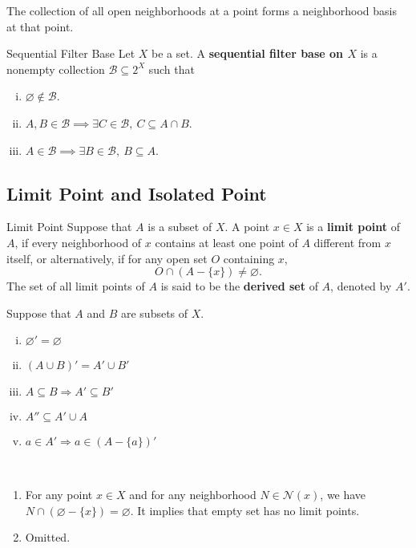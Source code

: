 \documentclass{report}
\begin{document}
\begin{proposition}{}{}
	The collection of all open neighborhoods at a point forms a neighborhood basis at that point.
\end{proposition}

\begin{definition}{Sequential Filter Base}{}
	Let $X$ be a set. A \textbf{sequential filter base on $X$} is a nonempty collection $\mathcal{B}\subseteq 2^X$ such that
	\begin{enumerate}[(i)]
		\item $\varnothing\notin\mathcal{B}$.
		\item $A,B\in\mathcal{B}\implies \exists C\in\mathcal{B},\ C\subseteq A\cap B$.
		\item $A\in\mathcal{B}\implies \exists B\in\mathcal{B},\ B\subseteq A$.
	\end{enumerate}
\end{definition}

\subsection{Limit Point and Isolated Point}
\begin{definition}{Limit Point}{}
	Suppose that $A$ is a subset of $X$. A point $x\in X$ is a \textbf{limit point} of $A$, if every neighborhood of $x$ contains at least one point of $A$ different from $x$ itself,
	or alternatively, if for any open set $O$ containing $x$,
	\[
		O\cap(A-\{x\})\ne\varnothing.
	\]
	The set of all limit points of $A$ is said to be the \textbf{derived set} of $A$, denoted by $A'$.
\end{definition}




\begin{proposition}{}{}
	Suppose that $A$ and $B$ are subsets of $X$.
	\begin{enumerate}[(i)]
		\item $\varnothing'=\varnothing$
		\item $(A \cup B)'=A'\cup B' $
		\item $A \subseteq B \Longrightarrow A' \subseteq B'$
		\item $A'' \subseteq A' \cup A $
		\item $a \in A' \Longrightarrow a \in(A-\{a\})' $
	\end{enumerate}
\end{proposition}

\begin{prf}~\\ \vspace{-1em}
	\begin{enumerate}
		\item For any point $x\in X$ and for any neighborhood $N\in\mathcal{N}(x)$, we have $N\cap(\varnothing-\{x\})=\varnothing$. It implies that empty set has no limit points.
		\item Omitted.
	\end{enumerate}
\end{prf}
\end{document}

